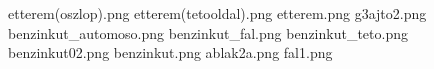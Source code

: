 etterem(oszlop).png
etterem(tetooldal).png
etterem.png
g3ajto2.png
benzinkut_automoso.png
benzinkut_fal.png
benzinkut_teto.png
benzinkut02.png
benzinkut.png
ablak2a.png
fal1.png
